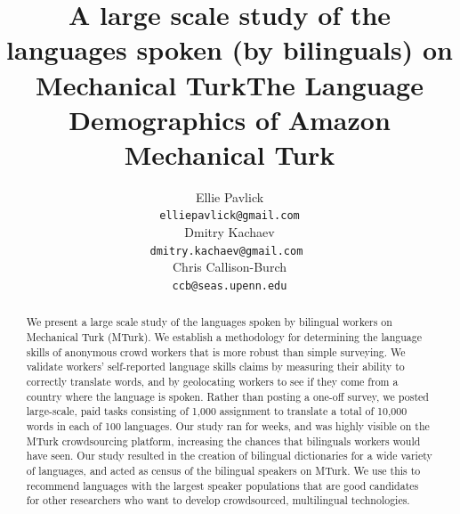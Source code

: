 \documentclass[11pt]{article}
\title{A large scale study of the languages spoken (by bilinguals) on Mechanical Turk}
\title{The Language Demographics of  Amazon Mechanical Turk}
\author{Ellie Pavlick  \\
  \small {\tt elliepavlick@gmail.com} \normalsize \\
  \And
  Dmitry Kachaev  \\
 \small  {\tt dmitry.kachaev@gmail.com } \normalsize \\
  \And
  Chris Callison-Burch \\
 \small  {\tt ccb@seas.upenn.edu} \normalsize \\
  }
\date{}
\begin{document}
\maketitle


\begin{abstract}
We present a large scale study of the languages spoken by bilingual workers on Mechanical Turk (MTurk).  
We establish a  methodology for determining the language skills of anonymous crowd workers that is more robust than simple surveying.  We validate workers' self-reported language skills claims by measuring their ability to correctly translate words, and by geolocating workers to see if they come from a country where the language is spoken. Rather than posting a one-off survey, we posted large-scale, paid tasks consisting of 1,000 assignment to translate a total of 10,000 words in each of 100 languages.  Our study ran for weeks, and was highly visible on the MTurk crowdsourcing platform, increasing the chances that bilinguals workers would have seen.  Our study resulted in the creation of bilingual dictionaries for a wide variety of languages, and acted as census of the bilingual speakers on MTurk.  We use this to recommend languages with the largest speaker populations that are good candidates for other researchers who want to  develop crowdsourced, multilingual technologies.


\end{abstract}
\end{document}
